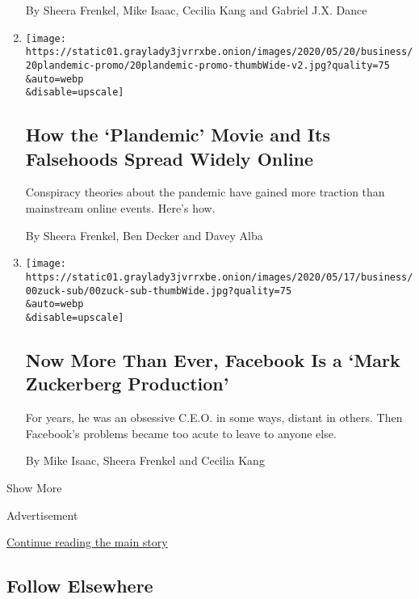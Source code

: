 \begin{enumerate}
  By Sheera Frenkel, Mike Isaac, Cecilia Kang and Gabriel J.X. Dance
\item
  \href{/2020/05/20/technology/plandemic-movie-youtube-facebook-coronavirus.html}{}

  \texttt{[image: https://static01.graylady3jvrrxbe.onion/images/2020/05/20/business/20plandemic-promo/20plandemic-promo-thumbWide-v2.jpg?quality=75\\\&auto=webp\\\&disable=upscale]}

  \hypertarget{how-the-plandemic-movie-and-its-falsehoods-spread-widely-online}{%
  \subsection{How the `Plandemic' Movie and Its Falsehoods Spread Widely
  Online}\label{how-the-plandemic-movie-and-its-falsehoods-spread-widely-online}}

  Conspiracy theories about the pandemic have gained more traction than
  mainstream online events. Here's how.

  By Sheera Frenkel, Ben Decker and Davey Alba
\item
  \href{/2020/05/16/technology/zuckerberg-facebook-coronavirus.html}{}

  \texttt{[image: https://static01.graylady3jvrrxbe.onion/images/2020/05/17/business/00zuck-sub/00zuck-sub-thumbWide.jpg?quality=75\\\&auto=webp\\\&disable=upscale]}

  \hypertarget{now-more-than-ever-facebook-is-a-mark-zuckerberg-production}{%
  \subsection{Now More Than Ever, Facebook Is a `Mark Zuckerberg
  Production'}\label{now-more-than-ever-facebook-is-a-mark-zuckerberg-production}}

  For years, he was an obsessive C.E.O. in some ways, distant in others.
  Then Facebook's problems became too acute to leave to anyone else.

  By Mike Isaac, Sheera Frenkel and Cecilia Kang
\end{enumerate}

Show More

Advertisement

\protect\hyperlink{after-mid2}{Continue reading the main story}

\hypertarget{follow-elsewhere}{%
\subsection{Follow Elsewhere}\label{follow-elsewhere}}

